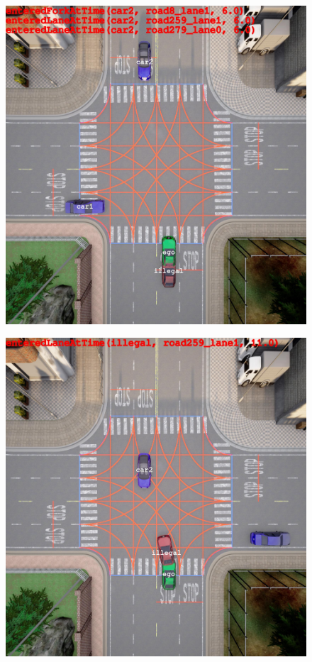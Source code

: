 \begin{figure}[ht]
\begin{minipage}[t]{.499\linewidth}
    {\includegraphics[width=\linewidth]{figures/chapter4/2_120.jpg}}%
  \end{minipage}%
  \hfill
  \begin{minipage}[t]{.499\linewidth}
    {\includegraphics[width=\linewidth]{figures/chapter4/2_220.jpg}}%

\end{minipage}
\end{figure}

